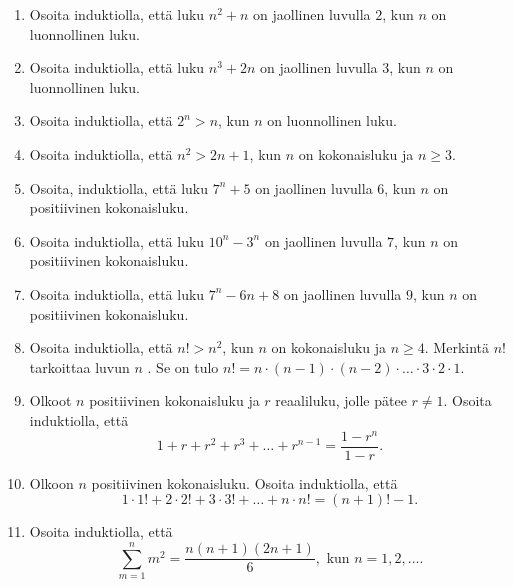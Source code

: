 \Harjoitustehtavat




\begin{enumerate}

\item Osoita induktiolla, että luku $n^2+n$ on jaollinen luvulla $2$, kun $n$ on luonnollinen luku.

\item Osoita induktiolla, että luku $n^3+2n$ on jaollinen luvulla $3$, kun $n$ on luonnollinen luku.

\item Osoita induktiolla, että $2^n > n$, kun $n$ on luonnollinen luku.

\item Osoita induktiolla, että $n^2 > 2n + 1$, kun $n$ on kokonaisluku ja $n \ge 3$.

\item Osoita, induktiolla, että luku $7^n + 5$ on jaollinen luvulla $6$, kun $n$ on positiivinen kokonaisluku.

\item Osoita induktiolla, että luku $10^n - 3^n$ on jaollinen luvulla $7$, kun $n$ on positiivinen kokonaisluku.

\item Osoita induktiolla, että luku $7^n - 6n + 8$ on jaollinen luvulla $9$, kun $n$ on positiivinen kokonaisluku.

\item Osoita induktiolla, että $n! > n^2$, kun $n$ on kokonaisluku ja $n \ge 4$. Merkintä $n!$ tarkoittaa luvun $n$ . Se on tulo $n! = n \cdot (n-1) \cdot (n-2) \cdot \ldots \cdot 3 \cdot 2 \cdot 1$.

\item Olkoot $n$ positiivinen kokonaisluku ja $r$ reaaliluku, jolle pätee $r \neq 1$. Osoita induktiolla, että 
\[
1 + r + r^2 + r^3 + \ldots + r^{n-1} = \frac{1-r^n}{1-r}.
\]

\item Olkoon $n$ positiivinen kokonaisluku. Osoita induktiolla, että 
\[
1 \cdot 1! + 2 \cdot 2! + 3 \cdot 3! + \ldots + n \cdot n! = (n + 1)! - 1.
\]

\item 
Osoita induktiolla, että 
\[
\sum_{m=1}^n m^2= \frac{n(n+1)(2n+1)}{6}, \textrm{ kun } n=1,2,\ldots.
\]


\end{enumerate}
